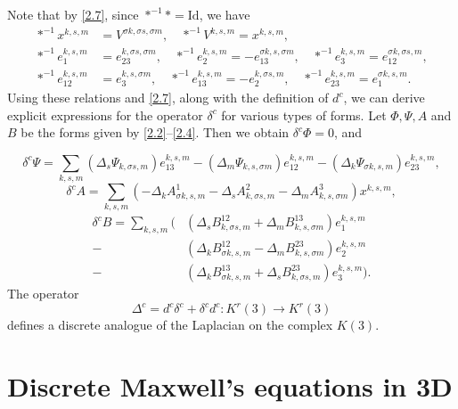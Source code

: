 \documentclass[english]{article}
\theoremstyle{plain}
\theoremstyle{definition}
\theoremstyle{remark}
\numberwithin{equation}{section}
\begin{document}
Note that by \eqref{2.7}, since $\ast^{-1} \ast = \mathrm{Id}$, we have
\begin{align}\label{2.18}
\ast^{-1} x^{k,s,m}&=V^{\sigma k,\sigma s,\sigma m}, \quad  \ast^{-1} V^{k,s,m}=x^{k,s, m},  \nonumber \\
\ast^{-1} e^{k,s,m}_1&=e^{k,\sigma s,\sigma m}_{23}, \quad  \ast^{-1} e^{k,s,m}_2=-e^{\sigma k,s,\sigma m}_{13},
\quad \ast^{-1} e^{k,s,m}_3=e^{\sigma k, \sigma s,m}_{12}, \nonumber \\
\ast^{-1} e^{k,s,m}_{12}&=e^{k,s,\sigma m}_3, \quad \ast^{-1} e^{k,s, m}_{13}=-e^{k,\sigma s, m}_2, \quad \ast^{-1} e^{k,s, m}_{23}=e^{\sigma k, s, m}_1.
\end{align}
 Using  these relations and \eqref{2.7},  along with  the definition of $d^c$, we can derive explicit expressions for the operator
$\delta^c$   for various types of forms.
Let $\Phi, \Psi, A$ and $B$ be the forms given by \eqref{2.2}–\eqref{2.4}. Then we obtain $\delta^c\Phi=0$, and

\begin{equation}\label{2.19}
\delta^c\Psi=\sum_{k,s,m}(\Delta_s\Psi_{k,\sigma s,m})e_{13}^{k,s,m}-(\Delta_m\Psi_{k,s,\sigma m})e_{12}^{k,s,m}-
(\Delta_k\Psi_{\sigma k,s,m})e_{23}^{k,s,m},
\end{equation}
\begin{equation}\label{2.20}
\delta^cA=\sum_{k,s,m}(-\Delta_kA^1_{\sigma k,s,m}-\Delta_sA^2_{k,\sigma s,m}-\Delta_mA^3_{k,s,\sigma m})x^{k,s,m},
\end{equation}
\begin{align}\label{2.21}
\delta^cB=\sum_{k,s,m}\big(&(\Delta_sB^{12}_{k,\sigma s,m}+\Delta_mB^{13}_{k,s,\sigma m})e_1^{k,s,m} \nonumber \\
-&(\Delta_kB^{12}_{\sigma k, s,m}-\Delta_mB^{23}_{k,s,\sigma m})e_2^{k,s,m}\nonumber \\
-&(\Delta_kB^{13}_{\sigma k, s,m}+\Delta_sB^{23}_{k,\sigma s, m})e_3^{k,s,m}\big ).
\end{align}
The  operator
\begin{equation}\label{2.22}
\Delta^c=d^c\delta^c+\delta^cd^c: K^r(3) \rightarrow K^r(3)
\end{equation}
 defines  a discrete analogue of the Laplacian on the complex $K(3)$.


  \section{Discrete Maxwell's equations in 3D}
\end{document}
